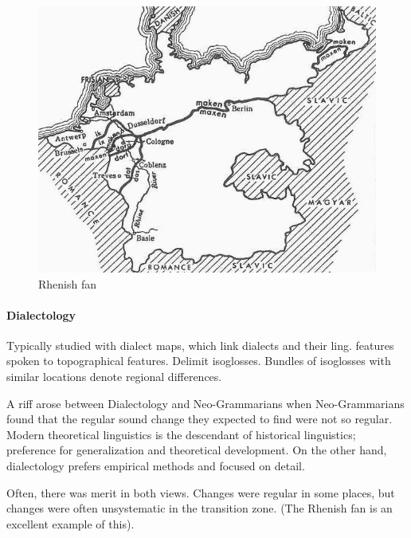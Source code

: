 \documentclass{exam}
\begin{document}
\begin{figure} [h!]
    \centering
    \includegraphics[scale=1.5]{images/rhenish_fan.jpg}
    \caption{Rhenish fan}
    \label{fig:my_label}
\end{figure}



\paragraph{Dialectology}Typically studied with dialect maps, which link dialects and their ling. features spoken to topographical features. Delimit isoglosses. Bundles of isoglosses with similar locations denote regional differences. 

A riff arose between Dialectology and Neo-Grammarians when Neo-Grammarians found that the regular sound change they expected to find were not so regular. Modern theoretical linguistics is the descendant of historical linguistics; preference for generalization and theoretical development. On the other hand, dialectology prefers empirical methods and focused on detail. 



Often, there was merit in both views. Changes were regular in some places, but changes were often unsystematic in the transition zone. (The Rhenish fan is an excellent example of this). 
\end{document}
